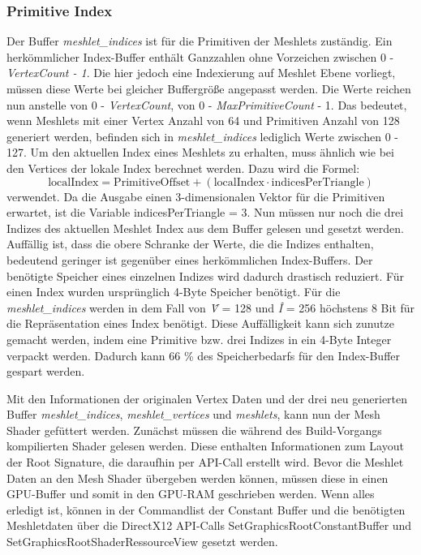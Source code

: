 \subsubsection*{Primitive Index}
Der Buffer \textit{meshlet\_indices} ist für die Primitiven der Meshlets zuständig.
Ein herkömmlicher Index-Buffer enthält Ganzzahlen ohne Vorzeichen zwischen 0 - \textit{VertexCount - 1}.
Die hier jedoch eine Indexierung auf Meshlet Ebene vorliegt, müssen diese Werte bei gleicher Buffergröße angepasst werden.
Die Werte reichen nun anstelle von 0 - \textit{VertexCount}, von 0 - \textit{MaxPrimitiveCount} - 1.
Das bedeutet, wenn Meshlets mit einer Vertex Anzahl von 64 und Primitiven Anzahl von 128 generiert werden, befinden sich in \textit{meshlet\_indices} lediglich Werte zwischen 0 - 127.
Um den aktuellen Index eines Meshlets zu erhalten, muss ähnlich wie bei den Vertices der lokale Index berechnet werden.
Dazu wird die Formel:
\begin{equation*}
\mathrm{localIndex} = \mathrm{PrimitiveOffset} + (\mathrm{localIndex} \cdot \mathrm{indicesPerTriangle})
\end{equation*}
verwendet.
Da die Ausgabe einen 3-dimensionalen Vektor für die Primitiven erwartet, ist die Variable indicesPerTriangle = 3.
Nun müssen nur noch die drei Indizes des aktuellen Meshlet Index aus dem Buffer gelesen und gesetzt werden.
\newline
Auffällig ist, dass die obere Schranke der Werte, die die Indizes enthalten, bedeutend geringer ist gegenüber eines herkömmlichen Index-Buffers.
Der benötigte Speicher eines einzelnen Indizes wird dadurch drastisch reduziert.
Für einen Index wurden ursprünglich 4-Byte Speicher benötigt.
Für die \textit{meshlet\_indices} werden in dem Fall von \textit{\^{V}} = 128 und \textit{\^{I}} = 256 höchstens 8 Bit für die Repräsentation eines Index benötigt.
Diese Auffälligkeit kann sich zunutze gemacht werden, indem eine Primitive bzw. drei Indizes in ein 4-Byte Integer verpackt werden.
Dadurch kann 66 \% des Speicherbedarfs für den Index-Buffer gespart werden.

Mit den Informationen der originalen Vertex Daten und der drei neu generierten Buffer \textit{meshlet\_indices}, \textit{meshlet\_vertices} und \textit{meshlets}, kann nun der Mesh Shader gefüttert werden.
Zunächst müssen die während des Build-Vorgangs kompilierten Shader gelesen werden.
Diese enthalten Informationen zum Layout der Root Signature, die daraufhin per API-Call erstellt wird.
Bevor die Meshlet Daten an den Mesh Shader übergeben werden können, müssen diese in einen GPU-Buffer und somit in den GPU-RAM geschrieben werden.
Wenn alles erledigt ist, können in der Commandlist der Constant Buffer und die benötigten Meshletdaten über die DirectX12 API-Calls SetGraphicsRootConstantBuffer und SetGraphicsRootShaderRessourceView gesetzt werden.

